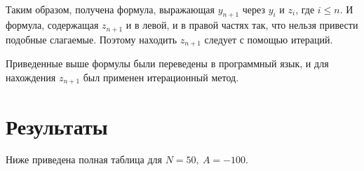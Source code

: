 \documentclass[12pt,a4paper]{article}
\begin{document}
\

Таким образом, получена формула, выражающая $y_{n+1}$ через $y_i$ и $z_i$, где $i\leq n$. И формула, содержащая $z_{n+1}$ и в левой, и в правой частях так, что нельзя привести подобные слагаемые. Поэтому находить $z_{n+1}$ следует с помощью итераций. 

Приведенные выше формулы были переведены в программный язык, и для нахождения $z_{n+1}$ был применен итерационный метод.


\newpage

\section{Результаты}

Ниже приведена полная таблица для $ N=50, \ A=-100 $.

\
\end{document}
